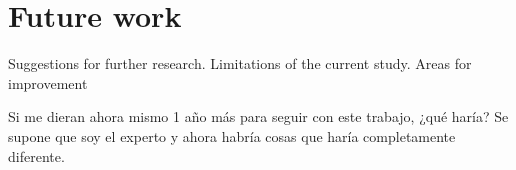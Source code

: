 \chapter{Future work} \label{sec:future}

Suggestions for further research. Limitations of the current study. Areas for improvement

Si me dieran ahora mismo 1 año más para seguir con este trabajo, ¿qué haría? Se supone que soy el experto y ahora habría cosas que haría completamente diferente.